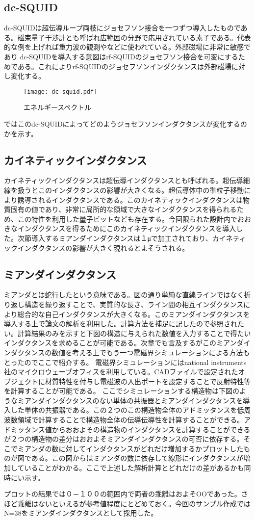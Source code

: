     \subsection{dc-SQUID}
        dc-SQUIDは超伝導ループ両枝にジョセフソン接合を一つずつ導入したものである。磁束量子干渉計とも呼ばれ広範囲の分野で応用されている素子である。代表的な例を上げれば重力波の観測やなどに使われている。外部磁場に非常に敏感であり
        dc-SQUIDを導入する意図はrf-SQUIDのジョセフソン接合を可変にするためである。これによりrf-SQUIDのジョセフソンインダクタンスは外部磁場に対し変化する。
        \begin{figure}[H]
            \centering
            \texttt{[image: dc-squid.pdf]}
            \caption{エネルギースペクトル}
        \end{figure}
        ではこのdc-SQUIDによってどのようジョセフソンインダクタンスが変化するのかを示す。
    \subsection{カイネティックインダクタンス}
        カイネティックインダクタンスは超伝導インダクタンスとも呼ばれる。超伝導細線を扱うとこのインダクタンスの影響が大きくなる。超伝導体中の準粒子移動により誘導されるインダクタンスである。このカイネティックインダクタンスは物質固有の値であり、非常に局所的な領域で大きなインダクタンスを得られるため、この特性を利用した量子ビットなども存在する。今回限られた設計内でおおきなインダクタンスを得るためにこのカイネティックインダクタンスを導入した。次節導入するミアンダインダクタンスは１μで加工されており、カイネティックインダクタンスの影響が大きく現れるとよそうされる。
    \subsection{ミアンダインダクタンス}
        ミアンダとは蛇行したという意味である。図の通り単純な直線ラインではなく折り返し構造を繰り返すことで、実質的な長さ、ライン間の相互インダクタンスにより総合的な自己インダクタンスが大きくなる。このミアンダインダクタンスを導入する上で論文の解析を利用した。計算方法を補足に記したので参照されたい。計算結果のみを示すと下図の構造に与えられた数値を入力することで得たいインダクタンスを求めることが可能である。次章でも言及するがこのミアンダインダクタンスの数値を考える上でもう一つ電磁界シミュレーションによる方法もとったのでここで紹介する。
        電磁界シミュレーションにはnational instruments社のマイクロウェーブオフィスを利用している。CADファイルで設定されたオブジェクトに材質特性を付与し電磁波の入出ポートを設定することで反射特性等を計算することが可能である。
        ここでシミュレーションする構造物は下図のようなミアンダインダクタンスのない単体の共振器とミアンダインダクタンスを導入した単体の共振器である。この２つのこの構造物全体のアドミッタンスを低周波数領域で計算することで構造物全体の伝導伝導性を計算することができる。アドミッタンス値からおおよその構造物のインダクタンスを計算することができるが２つの構造物の差分はおおよそミアンダインダクタンスの可否に依存する。そこでミアンダの数に対してインダクタンスがどれだけ増加するかプロットしたものが図である。この図からはミアンダの数に依存して線形にインダクタンスが増加していることがわかる。ここで上述した解析計算とどれだけの差があるかも同時にい示す。

        プロットの結果では０－１００の範囲内で両者の乖離はおよそOOであった。さほど乖離はないといえるが参考値程度にとどめておく。今回のサンプル作成ではN=38をミアンダインダクタンスとして採用した。
        
        